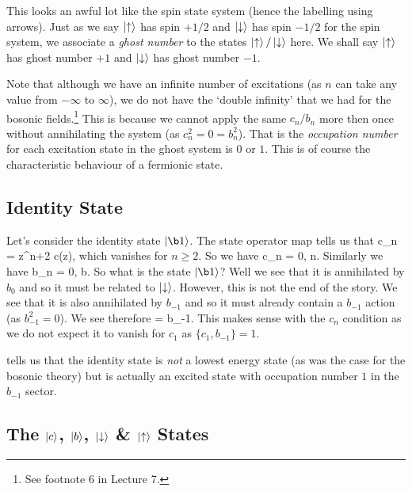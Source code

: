 This looks an awful lot like the spin state system (hence the labelling using arrows). Just as we say $\ket{\uparrow}$ has spin $+1/2$ and $\ket{\downarrow}$ has spin $-1/2$ for the spin system, we associate a \textit{ghost number} to the states $\ket{\uparrow}/\ket{\downarrow}$ here. We shall say $\ket{\uparrow}$ has ghost number $+1$ and $\ket{\downarrow}$ has ghost number $-1$. 

\br 
    Note that although we have an infinite number of excitations (as $n$ can take any value from $-\infty$ to $\infty$), we do not have the `double infinity' that we had for the bosonic fields.\footnote{See footnote 6 in Lecture 7.} This is because we cannot apply the same $c_n/b_n$ more then once without annihilating the system (as $c_n^2=0=b_n^2$). That is the \textit{occupation number} for each excitation state in the ghost system is $0$ or $1$. This is of course the characteristic behaviour of a fermionic state. 
\er 

\subsection{Identity State}

Let's consider the identity state $\ket{\b1}$. The state operator map tells us that 
\bse 
    c_n = \oint{} z^{n+2} c(z),
\ese 
which vanishes for $n\geq2$. So we have 
\bse 
    c_n = 0, \qquad \forall n.
\ese 
Similarly we have 
\bse 
    b_n = 0, \qquad \forall b.
\ese 
So what is the state $\ket{\b1}$? Well we see that it is annihilated by $b_0$ and so it must be related to $\ket{\downarrow}$. However, this is not the end of the story. We see that it is also annihilated by $b_{-1}$ and so it must already contain a $b_{-1}$ action (as $b_{-1}^2=0$). We see therefore
\be 
\label{eqn:IdentityStateBC}
     = b_{-1}\ket{\downarrow}.
\ee 
This makes sense with the $c_n$ condition as we do not expect it to vanish for $c_1$ as $\{c_1,b_{-1}\}=1$. 

 tells us that the identity state is \textit{not} a lowest energy state (as was the case for the bosonic theory) but is actually an excited state with occupation number $1$ in the $b_{-1}$ sector. 

\subsection{The $\ket{c}$, $\ket{b}$, $\ket{\downarrow}$ \& $\ket{\uparrow}$ States}


